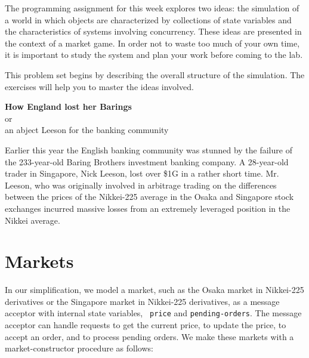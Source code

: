 

\def\fbox#1{%
 \vtop{\vbox{\hrule%
    \hbox{\vrule\kern3pt%
\vtop{\vbox{\kern3pt#1}\kern3pt}%
\kern3pt\vrule}}%
\hrule}}




\medskip

The programming assignment for this week explores two ideas: the
simulation of a world in which objects are characterized by
collections of state variables and the characteristics of systems
involving concurrency.  These ideas are presented in the context of a
market game.  In order not to waste too much of your own time, it is
important to study the system and plan your work before coming to the
lab.

This problem set begins by describing the overall structure of the
simulation.  The exercises will help you to master the ideas involved.

\begin{center}
{\bf How England lost her Barings } \\
or \\
an abject Leeson for the banking community
\end{center}

Earlier this year the English banking community was stunned by the
failure of the 233-year-old Baring Brothers investment banking
company.  A 28-year-old trader in Singapore, Nick Leeson, lost over
\$1G in a rather short time.  Mr. Leeson, who was originally involved
in arbitrage trading on the differences between the prices of the
Nikkei-225 average in the Osaka and Singapore stock exchanges incurred
massive losses from an extremely leveraged position in the Nikkei
average.

\section{Markets}

In our simplification, we model a market, such as the Osaka market in
Nikkei-225 derivatives or the Singapore market in Nikkei-225
derivatives, as a message acceptor with internal state variables, {\tt
price} and {\tt pending-orders}.  The message acceptor can handle
requests to get the current price, to update the price, to accept an
order, and to process pending orders.  We make these markets with a
market-constructor procedure as follows:


